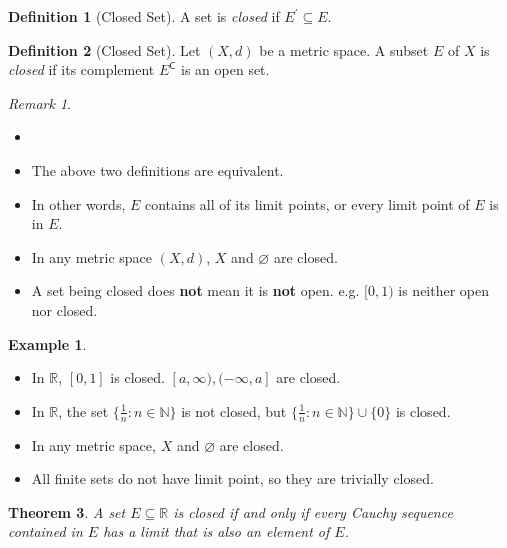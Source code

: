 \documentclass[12pt, lettersize]{book}
\theoremstyle{plain}
\newtheorem{thm}{Theorem}[section]
\theoremstyle{definition}
\newtheorem{dfn}[thm]{Definition}
\newtheorem*{eg}{Example}
\theoremstyle{remark}
\newtheorem*{rem}{Remark}
\newcommand{\R}{\mathbb{R}}
\newcommand{\N}{\mathbb{N}}
\newcommand{\com}{\mathsf{C}}
\let\emptyset\varnothing
\begin{document}
		\begin{dfn}[Closed Set]
			A set is \emph{closed} if $E^\prime\subseteq E$.
		\end{dfn}
		\begin{dfn}[Closed Set]
			Let $(X,d)$ be a metric space. A subset $E$ of $X$ is \emph{closed} if its complement $E^\com$ is an open set.
		\end{dfn}
		\begin{rem}
		\begin{itemize}
			\item[]
			\item The above two definitions are equivalent.
			\item In other words, $E$ contains all of its limit points, or every limit point of $E$ is in $E$.
			\item In any metric space $(X,d)$, $X$ and $\emptyset$ are closed.
			\item A set being closed does \textbf{not} mean it is \textbf{not} open. e.g. $[0,1)$ is neither open nor closed.
		\end{itemize}
		\end{rem}
		\begin{eg}
			\begin{itemize}
				\item In $\R$, $[0,1]$ is closed. $[a,\infty),(-\infty,a]$ are closed.
				\item In $\R$, the set $\{\frac{1}{n}: n\in\N\}$ is not closed, but $\{\frac{1}{n}: n\in\N\}\cup\{0\}$ is closed.
				\item In any metric space, $X$ and $\emptyset$ are closed.
				\item All finite sets do not have limit point, so they are trivially closed.
			\end{itemize}
		\end{eg}
		
		\begin{thm}
		A set $E\subseteq \R$ is closed if and only if every Cauchy sequence contained in $E$ has a limit that is also an element of $E$.
		\end{thm}
		
\end{document}
